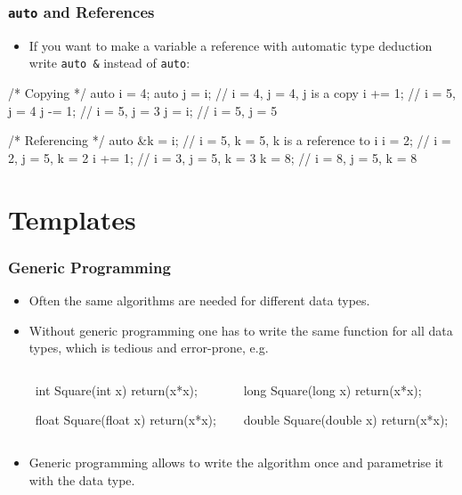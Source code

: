 \documentclass[aspectratio=169,ignorenonframetext,11pt]{beamer}
\def\inline{\lstinline[basicstyle=\small\ttfamily]}
\begin{document}
\begin{frame}[fragile]
  \frametitle<presentation>{\texttt{auto} and References}
  \begin{itemize}
  \item If you want to make a variable a reference with automatic type deduction write \inline!auto &! instead of \inline!auto!:
  \end{itemize}

  \begin{cppcode}
/* Copying */
auto i = 4;
auto j = i;  // i = 4, j = 4, j is a copy
i += 1;      // i = 5, j = 4
j -= 1;      // i = 5, j = 3
j  = i;      // i = 5, j = 5

/* Referencing */
auto &k = i; // i = 5, k = 5, k is a reference to i
i  = 2;      // i = 2, j = 5, k = 2
i += 1;      // i = 3, j = 5, k = 3
k  = 8;      // i = 8, j = 5, k = 8
  \end{cppcode}
\end{frame}


\section{Templates}


\begin{frame}[fragile]
\frametitle<presentation>{Generic Programming}


\begin{itemize}%
\item Often the same algorithms are needed for different data types.
\item Without generic programming one has to write the same function for all data types, which is tedious and error-prone, e.g.
\end{itemize}
\vspace*{-1em}
\begin{columns}
  \begin{column}{0.\linewidth}
  \end{column}
  \begin{column}{0.4\linewidth}
\begin{cppcode}
int Square(int x)
{
  return(x*x);
}

float Square(float x)
{
  return(x*x);
}
\end{cppcode}
  \end{column}
  \begin{column}{0.4\linewidth}
\begin{cppcode}
long Square(long x)
{
  return(x*x);
}

double Square(double x)
{
  return(x*x);
}      
\end{cppcode}
  \end{column}
\end{columns}
\begin{itemize}
\item Generic programming allows to write the algorithm once and parametrise it with the
data type.
\end{itemize}

\end{frame}
\end{document}
